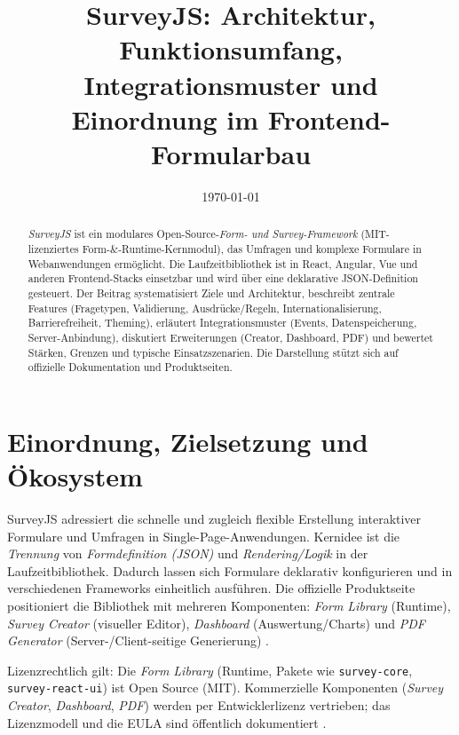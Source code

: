 \documentclass[11pt,a4paper]{article}
\title{SurveyJS: Architektur, Funktionsumfang, Integrationsmuster und Einordnung im Frontend-Formularbau}
\author{ }
\date{\today}
\begin{document}
\maketitle

\begin{abstract}
\noindent
\emph{SurveyJS} ist ein modulares Open-Source-\emph{Form- und Survey-Framework} (MIT-lizenziertes Form-\&-Runtime-Kernmodul), das Umfragen und komplexe Formulare in Webanwendungen ermöglicht. Die Laufzeitbibliothek ist in React, Angular, Vue und anderen Frontend-Stacks einsetzbar und wird über eine deklarative JSON-Definition gesteuert. Der Beitrag systematisiert Ziele und Architektur, beschreibt zentrale Features (Fragetypen, Validierung, Ausdrücke/Regeln, Internationalisierung, Barrierefreiheit, Theming), erläutert Integrationsmuster (Events, Datenspeicherung, Server-Anbindung), diskutiert Erweiterungen (Creator, Dashboard, PDF) und bewertet Stärken, Grenzen und typische Einsatzszenarien. Die Darstellung stützt sich auf offizielle Dokumentation und Produktseiten.
\end{abstract}

\section{Einordnung, Zielsetzung und Ökosystem}
SurveyJS adressiert die schnelle und zugleich flexible Erstellung interaktiver Formulare und Umfragen in Single-Page-Anwendungen. Kernidee ist die \emph{Trennung} von \emph{Formdefinition (JSON)} und \emph{Rendering/Logik} in der Laufzeitbibliothek. Dadurch lassen sich Formulare deklarativ konfigurieren und in verschiedenen Frameworks einheitlich ausführen. Die offizielle Produktseite positioniert die Bibliothek mit mehreren Komponenten: \emph{Form Library} (Runtime), \emph{Survey Creator} (visueller Editor), \emph{Dashboard} (Auswertung/Charts) und \emph{PDF Generator} (Server-/Client-seitige Generierung) \cite{surveyjs-form-library, surveyjs-products}.

Lizenzrechtlich gilt: Die \emph{Form Library} (Runtime, Pakete wie \texttt{survey-core}, \texttt{survey-react-ui}) ist Open Source (MIT). Kommerzielle Komponenten (\emph{Survey Creator}, \emph{Dashboard}, \emph{PDF}) werden per Entwicklerlizenz vertrieben; das Lizenzmodell und die EULA sind öffentlich dokumentiert \cite{surveyjs-licensing, surveyjs-eula, survey-creator-npm}.
\vspace{\baselineskip}
\vspace{\baselineskip}
\vspace{\baselineskip}
\vspace{\baselineskip}
\vspace{\baselineskip}
\vspace{\baselineskip}
\vspace{\baselineskip}
\end{document}
